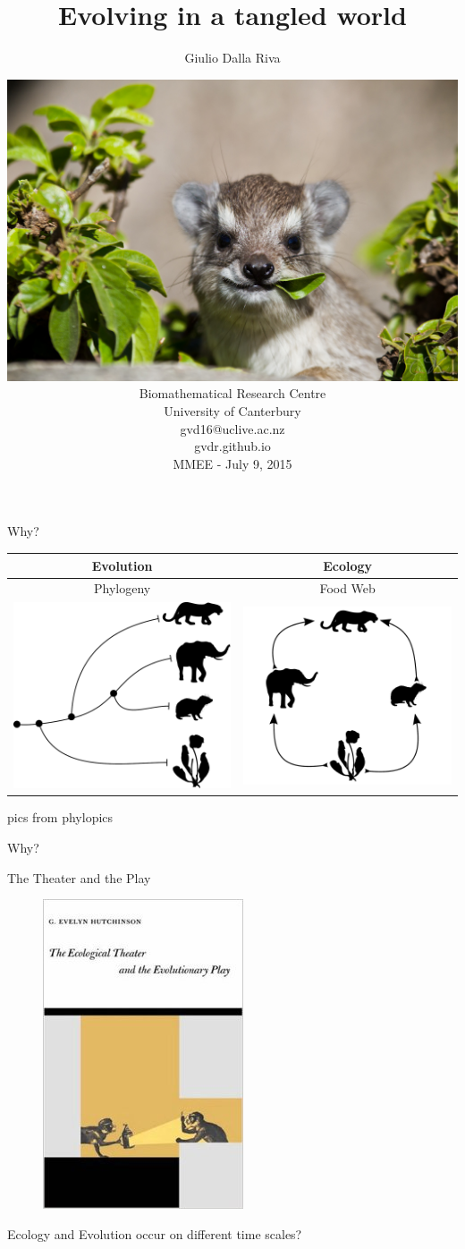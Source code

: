 \documentclass[]{beamer}
\title{Evolving in a tangled world}
\author{Giulio Dalla Riva}
\date{ \includegraphics[width=0.4\linewidth]{images/hyraxchew.jpg}\\
  {\tiny Biomathematical Research Centre\\
  University of Canterbury\\
  gvd16@uclive.ac.nz\\
  gvdr.github.io\\}
MMEE - July 9, 2015}
\begin{document}
\frame{\titlepage
\addtocounter{framenumber}{-1}}

\begin{frame}{Why?}

\centering
\begin{tabular}{|c|c|}\hline
Evolution & Ecology \\\hline\hline
Phylogeny & Food Web \\
\includegraphics[width=0.4 \textwidth]{images/small_phylo.pdf} & \includegraphics[width=0.4 \textwidth]{images/small_fw.pdf} \\ \hline
\end{tabular}

\tiny{pics from phylopics}
\end{frame}

\begin{frame}{Why?}

\centering
The Theater and the Play

\begin{figure}
\centering
\includegraphics[height=0.5 \textheight]{images/hutchinson_ecotheatreevoplay.jpg}
\end{figure}
\centering
{\tiny Ecology and Evolution occur on different time scales?}

\end{frame}
\end{document}
